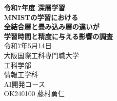 \begin{titlepage}
    \centering
    \textbf{\LARGE 令和7年度 深層学習}
     \\
    \textbf{\LARGE
        MNISTの学習における \\
        全結合層と畳み込み層の違いが \\
        学習時間と精度に与える影響の調査
    }
     \\
    \large 令和7年5月14日
    \vspace{10pt} \\
    \large 大阪国際工科専門職大学 \\
    \large 工科学部 \\
    \large 情報工学科 \\
    \large AI開発コース
    \vspace{10pt} \\
    \large OK240100 藤村勇仁
\end{titlepage}
